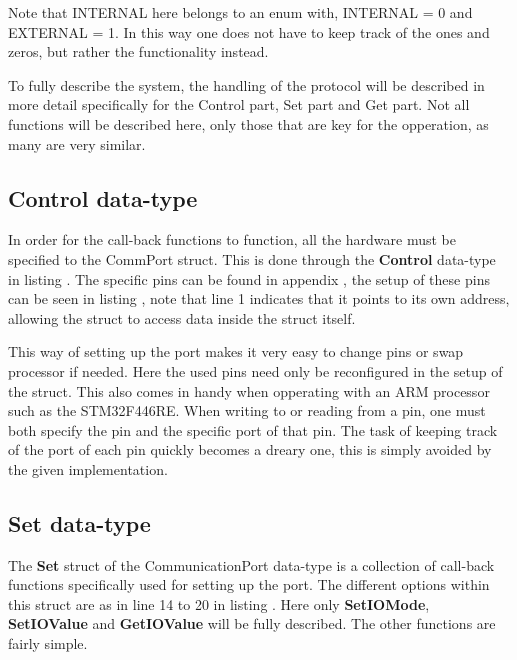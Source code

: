 Note that INTERNAL here belongs to an enum with, INTERNAL = 0 and EXTERNAL = 1. In this way one does not have to keep track of the ones and zeros, but rather the functionality instead.

To fully describe the system, the handling of the protocol will be described in more detail specifically for the Control part, Set part and Get part. Not all functions will be described here, only those that are key for the opperation, as many are very similar.

\subsection*{Control data-type}
In order for the call-back functions to function, all the hardware must be specified to the CommPort struct. This is done through the \textbf{Control} data-type in listing . The specific pins can be found in appendix , the setup of these pins can be seen in listing , note that line 1 indicates that it points to its own address, allowing the struct to access data inside the struct itself.



This way of setting up the port makes it very easy to change pins or swap processor if needed. Here the used pins need only be reconfigured in the setup of the struct. This also comes in handy when opperating with an ARM processor such as the STM32F446RE. When writing to or reading from a pin, one must both specify the pin and the specific port of that pin. The task of keeping track of the port of each pin quickly becomes a dreary one, this is simply avoided by the given implementation.


\subsection*{Set data-type}
The \textbf{Set} struct of the CommunicationPort data-type is a collection of call-back functions specifically used for setting up the port. The different options within this struct are as in line 14 to 20 in listing . Here only \textbf{SetIOMode}, \textbf{SetIOValue} and \textbf{GetIOValue} will be fully described. The other functions are fairly simple.

